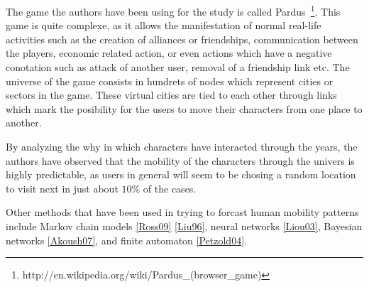 The game the authors have been using for the study is called
Pardus~\footnote{http://en.wikipedia.org/wiki/Pardus\_(browser\_game)}. This
game is quite complexe, as it allows the manifestation of normal real-life
activities such as the creation of alliances or friendships, communication
between the players, economic related action, or even actions which have a
negative conotation such as attack of another user, removal of a friendship
link etc. The universe of the game consists in hundrets of nodes which represent
cities or sectors in the game. These virtual cities are tied to each other
through links which mark the posibility for the users to move their characters
from one place to another.

By analyzing the why in which characters have interacted through the years, the
authors have observed that the mobility of the characters through the univers is
highly predictable, as users in general will seem to be chosing a random
location to visit next in just about $10\%$ of the cases.


Other methods that have been used in trying to forcast human mobility patterns
include Markov chain models \ref{Ross09} \ref{Liu96}, neural networks
\ref{Liou03}, Bayesian networks \ref{Akoush07}, and finite automaton
\ref{Petzold04}.


